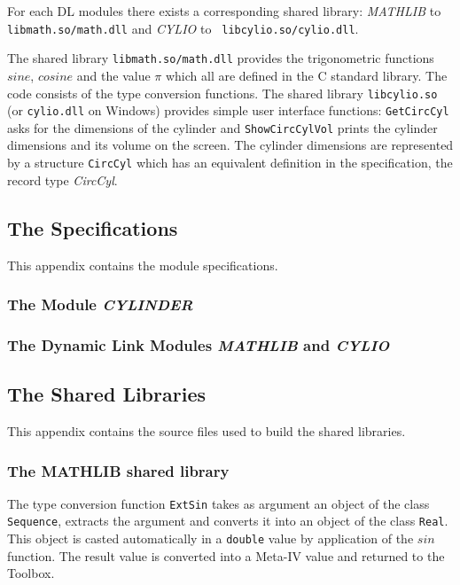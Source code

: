\documentclass[\pformat,12pt]{article}
\begin{document}
For each DL modules there exists a corresponding shared library: {\sl
  MATHLIB} to {\tt libmath.so/math.dll} and {\sl CYLIO} to {\tt
  libcylio.so/cylio.dll}. 
 
The shared library {\tt libmath.so/math.dll} provides the trigonometric
functions $sine$, $cosine$ and the value $\pi$ which all are defined
in the C standard library. The code consists of the type conversion
functions.  The shared library \texttt{libcylio.so} (or
\texttt{cylio.dll} on Windows) provides
simple user 
interface functions: {\tt GetCircCyl} asks for the dimensions of the
cylinder and {\tt ShowCircCylVol} prints the cylinder dimensions and
its volume on the screen. The cylinder dimensions are represented by a
structure {\tt CircCyl} which has an equivalent definition in the
specification, the record type {\it CircCyl}.

\subsection{The Specifications}
This appendix contains the  module specifications.
\subsubsection{The Module \textsl{CYLINDER}}


\subsubsection{The Dynamic Link Modules \textsl{MATHLIB} and \textsl{CYLIO}}
\label{sec:math-cylio}





\subsection{The Shared Libraries}
This appendix contains the source files used to build the shared libraries.
\subsubsection{The MATHLIB shared library}


The type conversion function {\tt ExtSin} takes as argument an object 
of the class {\tt Sequence}, extracts the argument and converts it into an
object of the class {\tt Real}. This object is casted automatically in a
{\tt double} value by application of the $sin$ function.
The result value is converted into a Meta-IV value and returned to the
Toolbox.
\end{document}
